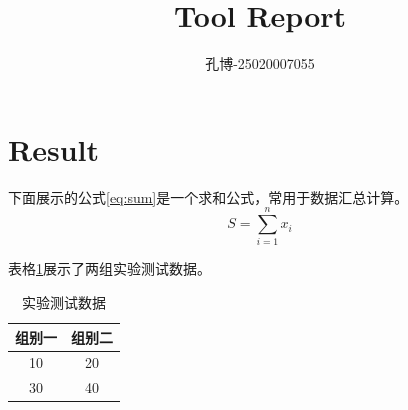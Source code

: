 \documentclass{article}
\begin{document}
\title{Tool Report}
\author{孔博-25020007055}
\maketitle

\section{Result}

下面展示的公式\ref{eq:sum}是一个求和公式，常用于数据汇总计算。
\begin{equation}
\label{eq:sum}
S = \sum_{i=1}^{n} x_i
\end{equation}

表格\ref{tab:test}展示了两组实验测试数据。
\begin{table}[htbp]
  \centering
  \caption{实验测试数据}
  \label{tab:test}
  \begin{tabular}{cc}
    \toprule
    组别一 & 组别二 \\
    \midrule
    10 & 20 \\
    30 & 40 \\
    \bottomrule
  \end{tabular}
\end{table}
\end{document}

